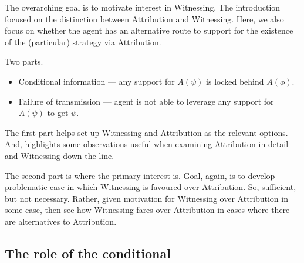\documentclass[10pt]{article}
\newcommand{\WR}[0]{\textsf{Witnessing}}
\newcommand{\AR}[0]{\textsf{Attribution}}
\begin{document}
The overarching goal is to motivate interest in \WR.
The introduction focused on the distinction between \AR{} and \WR.
Here, we also focus on whether the agent has an alternative route to support for the existence of the (particular) strategy via \AR.

Two parts.
\begin{itemize}
\item Conditional information --- any support for \(A(\psi)\) is locked behind \(A(\phi)\).
\item Failure of transmission --- agent is not able to leverage any support for \(A(\psi)\) to get \(\psi\).
\end{itemize}

The first part helps set up \WR{} and \AR{} as the relevant options.
And, highlights some observations useful when examining \AR{} in detail --- and \WR{} down the line.

The second part is where the primary interest is.
Goal, again, is to develop problematic case in which \WR{} is favoured over \AR.
So, sufficient, but not necessary.
Rather, given motivation for \WR{} over \AR{} in some case, then see how \WR{} fares over \AR{} in cases where there are alternatives to \AR{}.

\subsection{The role of the conditional}
\label{sec:role-conditional}
\end{document}
